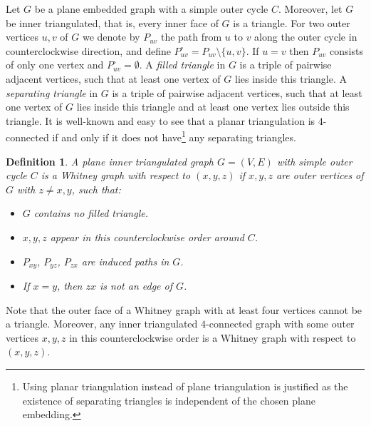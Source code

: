 \documentclass[a4paper,10pt]{article}
\theoremstyle{plain}
\newtheorem{defn}[thm]{Definition}
\newcommand{\inner}[1]{{#1}^{\circ}}
\begin{document}
Let $G$ be a plane embedded graph with a simple outer cycle $C$. Moreover, let $G$ be inner triangulated, that is, every inner face of $G$ is a triangle. For two outer vertices $u,v$ of $G$ we denote by $P_{uv}$ the path from $u$ to $v$ along the outer cycle in counterclockwise direction, and define $\inner{P}_{uv} = P_{uv} \setminus \{u,v\}$. If $u=v$ then $P_{uv}$ consists of only one vertex and $\inner{P}_{uv} = \emptyset$. A \emph{filled triangle} in $G$ is a triple of pairwise adjacent vertices, such that at least one vertex of $G$ lies inside this triangle.
A \emph{separating triangle} in $G$ is a triple of pairwise adjacent vertices, such that at least one vertex of $G$ lies inside this triangle and at least one vertex lies outside this triangle. It is well-known and easy to see that a planar triangulation is $4$-connected if and only if it does not have\footnote{Using planar triangulation instead of plane triangulation is justified as the existence of separating triangles is independent of the chosen plane embedding.} any separating triangles.

\begin{defn}
 A plane inner triangulated graph $G = (V,E)$ with simple outer cycle $C$ is a \emph{Whitney graph with respect to $(x,y,z)$} if $x,y,z$ are outer vertices of $G$ with $z \neq x,y$, such that:
 \begin{itemize}
  \item $G$ contains no filled triangle.
  \item $x,y,z$ appear in this counterclockwise order around $C$.
  \item $P_{xy}$, $P_{yz}$, $P_{zx}$ are induced paths in $G$.
  \item If $x=y$, then $zx$ is not an edge of $G$.
 \end{itemize}
\end{defn}


Note that the outer face of a Whitney graph with at least four vertices cannot be a triangle.
Moreover, any inner triangulated $4$-connected graph with some outer vertices $x,y,z$ in this counterclockwise order is a Whitney graph with respect to $(x,y,z)$. 
\end{document}
